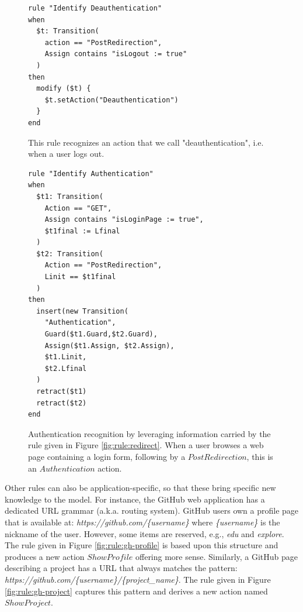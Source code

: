 \begin{figure}[h]
\begin{framed}
\begin{BVerbatim}
rule "Identify Deauthentication"
when
  $t: Transition(
    action == "PostRedirection",
    Assign contains "isLogout := true"
  )
then
  modify ($t) {
    $t.setAction("Deauthentication")
  }
end
\end{BVerbatim}
\end{framed}

    \caption{This rule recognizes an action that we call
    "deauthentication", i.e. when a user logs out.}
    \label{fig:rule:deauth}
\end{figure}

\begin{figure}[h]
\begin{framed}
\begin{BVerbatim}
rule "Identify Authentication"
when
  $t1: Transition(
    Action == "GET",
    Assign contains "isLoginPage := true",
    $t1final := Lfinal
  )
  $t2: Transition(
    Action == "PostRedirection",
    Linit == $t1final
  )
then
  insert(new Transition(
    "Authentication",
    Guard($t1.Guard,$t2.Guard),
    Assign($t1.Assign, $t2.Assign),
    $t1.Linit,
    $t2.Lfinal
  )
  retract($t1)
  retract($t2)
end
\end{BVerbatim}
\end{framed}

    \caption{Authentication recognition by leveraging information
    carried by the rule given in Figure \ref{fig:rule:redirect}.
    When a user browses a web page containing a login form,
    following by a $PostRedirection$, this is an $Authentication$
    action.}
    \label{fig:rule:auth}
\end{figure}

Other rules can also be application-specific, so that these bring
specific new knowledge to the model. For instance, the GitHub web
application has a dedicated URL grammar (a.k.a. routing system).
GitHub users own a profile page that is available at:
\textit{https://github.com/\{username\}} where \textit{\{username\}}
is the nickname of the user. However, some items are reserved,
e.g., \textit{edu} and \textit{explore}. The rule given in Figure
\ref{fig:rule:gh-profile} is based upon this structure and
produces a new action $ShowProfile$ offering more sense.
Similarly, a GitHub page describing a project has a URL that
always matches the pattern:
\textit{https://github.com/\{username\}/\{project\_name\}}. The
rule given in Figure \ref{fig:rule:gh-project} captures this
pattern and derives a new action named $ShowProject$.

